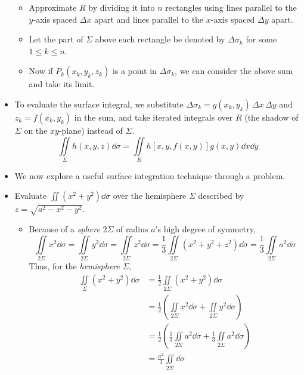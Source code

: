 \documentclass[../main.tex]{subfiles}
\begin{document}
\begin{itemize}
\begin{itemize}
        \item Approximate $R$ by dividing it into $n$ rectangles using lines parallel to the $y$-axis spaced $\Delta x$ apart and lines parallel to the $x$-axis spaced $\Delta y$ apart.
        \item Let the part of $\Sigma$ above each rectangle be denoted by $\Delta\sigma_k$ for some $1\leq k\leq n$.
        \item Now if $P_k(x_k,y_k,z_k)$ is a point in $\Delta\sigma_k$, we can consider the above sum and take its limit.
    \end{itemize}
    \item {}To evaluate the surface integral, we substitute $\Delta\sigma_k=g(x_k,y_k)\, \Delta x\, \Delta y$ and $z_k=f(x_k,y_k)$ in the sum, and take iterated integrals over $R$ (the shadow of $\Sigma$ on the $xy$-plane) instead of $\Sigma$.
    \begin{equation*}
        \iint\limits_\Sigma h(x,y,z)\dd{\sigma} = \iint\limits_R h[x,y,f(x,y)]g(x,y)\dd{x}\dd{y}
    \end{equation*}
    \item We now explore a useful surface integration technique through a problem.
    \item Evaluate $\iint(x^2+y^2)\dd{\sigma}$ over the hemisphere $\Sigma$ described by $z=\sqrt{a^2-x^2-y^2}$.
    \begin{itemize}
        \item Because of a \emph{sphere} $2\Sigma$ of radius $a$'s high degree of symmetry,
        \begin{equation*}
            \iint\limits_{2\Sigma}x^2\dd{\sigma} = \iint\limits_{2\Sigma}y^2\dd{\sigma}
            = \iint\limits_{2\Sigma}z^2\dd{\sigma}
            = \frac{1}{3}\iint\limits_{2\Sigma}(x^2+y^2+z^2)\dd{\sigma}
            = \frac{1}{3}\iint\limits_{2\Sigma}a^2\dd{\sigma}
        \end{equation*}
        Thus, for the \emph{hemisphere} $\Sigma$,
        \begin{align*}
            \iint\limits_\Sigma(x^2+y^2)\dd{\sigma} &= \frac{1}{2}\iint\limits_{2\Sigma}(x^2+y^2)\dd{\sigma}\\
            &= \frac{1}{2}\left( \iint\limits_{2\Sigma}x^2\dd{\sigma}+\iint\limits_{2\Sigma}y^2\dd{\sigma} \right)\\
            &= \frac{1}{2}\left( \frac{1}{3}\iint\limits_{2\Sigma}a^2\dd{\sigma}+\frac{1}{3}\iint\limits_{2\Sigma}a^2\dd{\sigma} \right)\\
            &= \frac{a^2}{3}\iint\limits_{2\Sigma}\dd{\sigma}\\

\end{align*}
\end{itemize}
\end{itemize}
\end{document}
